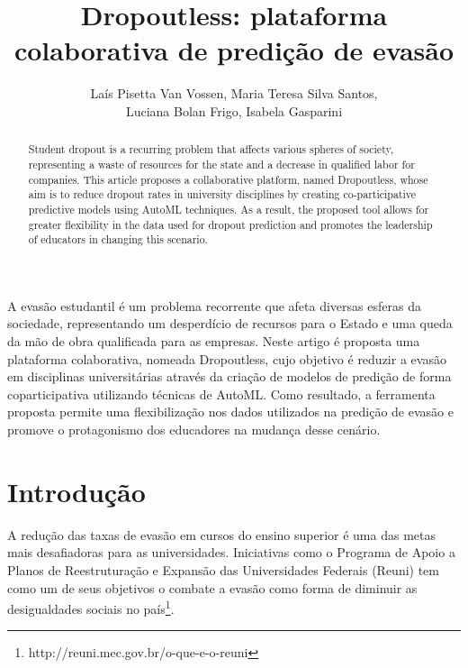 \documentclass[12pt]{article}
\title{Dropoutless: plataforma colaborativa de predição de evasão}
\author{Laís Pisetta Van Vossen\inst{1}, Maria Teresa Silva Santos\inst{1}, \\Luciana Bolan Frigo\inst{2}, Isabela Gasparini\inst{1} }
\begin{document}
 

\maketitle

\begin{abstract}
Student dropout is a recurring problem that affects various spheres of society, representing a waste of resources for the state and a decrease in qualified labor for companies. This article proposes a collaborative platform, named Dropoutless, whose aim is to reduce dropout rates in university disciplines by creating co-participative predictive models using AutoML techniques. As a result, the proposed tool allows for greater flexibility in the data used for dropout prediction and promotes the leadership of educators in changing this scenario.
\end{abstract}
     
\begin{resumo} 
A evasão estudantil é um problema recorrente que afeta diversas esferas da sociedade, representando um desperdício de recursos para o Estado e uma queda da mão de obra qualificada para as empresas. Neste artigo é proposta uma plataforma colaborativa, nomeada Dropoutless, cujo objetivo é reduzir a evasão em disciplinas universitárias através da criação de modelos de predição de forma coparticipativa utilizando técnicas de AutoML. Como resultado, a ferramenta proposta permite uma flexibilização nos dados utilizados na predição de evasão e promove o protagonismo dos educadores na mudança desse cenário.
\end{resumo}


\section{Introdução}







A redução das taxas de evasão em cursos do ensino superior é uma das metas mais desafiadoras para as universidades. Iniciativas como o Programa de Apoio a Planos de Reestruturação e Expansão das Universidades Federais (Reuni) tem como um de seus objetivos o combate a evasão como forma de diminuir as desigualdades sociais no país\footnote{http://reuni.mec.gov.br/o-que-e-o-reuni}. 
\end{document}
